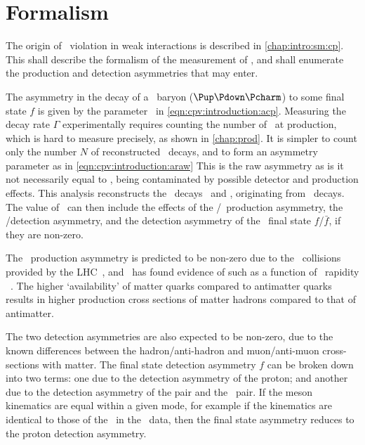 \chapter{Formalism}
\label{chap:cpv:theory}

The origin of \CP\ violation in weak interactions is described in 
\cref{chap:intro:sm:cp}.
This  shall describe the formalism of the measurement 
of \dACP, and shall enumerate the production and detection asymmetries that may 
enter.

The asymmetry in the decay of a \PLambdac\ baryon ($\Pup\Pdown\Pcharm$) to some 
final state $f$ is given by the parameter \ACP\ in 
\cref{eqn:cpv:introduction:acp}.
Measuring the decay rate $\Gamma$ experimentally requires counting the number 
of \PLambdac\ at production, which is hard to measure precisely, as shown in 
\cref{chap:prod}.
It is simpler to count only the number $N$ of reconstructed \PLambdac\ decays, 
and to form an asymmetry parameter as in \cref{eqn:cpv:introduction:araw}
This is the raw asymmetry as is it not necessarily equal to \ACP, being 
contaminated by possible detector and production effects.
This analysis reconstructs the \PLambdac\ decays \pKK\ and \ppipi, originating 
from \ decays.
The value of \ARaw\ can then include the effects of the \PLambdab/\APLambdab\ 
production asymmetry, the \Pmuon/\APmuon detection asymmetry, and the detection 
asymmetry of the \PLambdac\ final state $f$/$\bar{f}$, if they are non-zero.

The \PLambdab\ production asymmetry is predicted to be non-zero due to the \pp\ 
collisions provided by the \ac{LHC}~\cite{PhysRevD.90.014023}, and \lhcb\ has 
found evidence of such as a function of \PLambdab\ rapidity 
\lhcb~\cite{Aaij:2015fea}.
The higher `availability' of matter quarks compared to antimatter quarks 
results in higher production cross sections of matter hadrons compared to that 
of antimatter.

The two detection asymmetries are also expected to be non-zero, due to the 
known differences between the hadron/anti-hadron and muon/anti-muon 
cross-sections with matter.
The final state detection asymmetry $f$ can be broken down into two terms: one 
due to the detection asymmetry of the proton; and another due to the detection 
asymmetry of the \KmKp pair and the \pimpip\ pair.
If the meson kinematics are equal within a given mode, for example if the 
\PKminus kinematics are identical to those of the \PKplus\ in the \pKK\ data, 
then the final state asymmetry reduces to the proton detection asymmetry.


